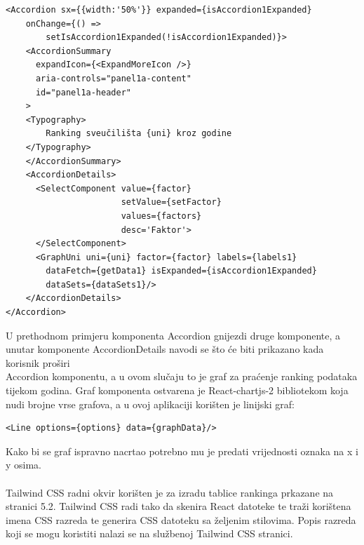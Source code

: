 \documentclass[times, utf8, zavrsni]{fer}
\begin{document}
\begin{verbatim}
<Accordion sx={{width:'50%'}} expanded={isAccordion1Expanded} 
    onChange={() => 
        setIsAccordion1Expanded(!isAccordion1Expanded)}>
    <AccordionSummary
      expandIcon={<ExpandMoreIcon />}
      aria-controls="panel1a-content"
      id="panel1a-header"
    >
    <Typography>
        Ranking sveučilišta {uni} kroz godine
    </Typography>
    </AccordionSummary>
    <AccordionDetails>
      <SelectComponent value={factor} 
                       setValue={setFactor} 
                       values={factors} 
                       desc='Faktor'>
      </SelectComponent>
      <GraphUni uni={uni} factor={factor} labels={labels1} 
        dataFetch={getData1} isExpanded={isAccordion1Expanded} 
        dataSets={dataSets1}/>
    </AccordionDetails>
</Accordion>
\end{verbatim}
U prethodnom primjeru komponenta Accordion gnijezdi druge komponente, a unutar komponente AccordionDetails navodi se 
što će biti prikazano kada korisnik proširi \\Accordion komponentu, a u ovom slučaju to je graf za praćenje ranking podataka tijekom godina.
\newpage Graf komponenta ostvarena je React-chartjs-2 bibliotekom koja nudi brojne vrse grafova, a u ovoj aplikaciji korišten je linijski graf:
\begin{lstlisting}
<Line options={options} data={graphData}/>
\end{lstlisting}
Kako bi se graf ispravno nacrtao potrebno mu je predati vrijednosti oznaka na x i y osima.
\\\\Tailwind CSS radni okvir korišten je za izradu tablice rankinga prkazane na stranici 5.2. Tailwind CSS radi tako da skenira React datoteke 
te traži korištena imena CSS razreda te generira CSS datoteku sa željenim stilovima. Popis razreda koji se mogu koristiti nalazi se na službenoj
Tailwind CSS stranici.
\end{document}
